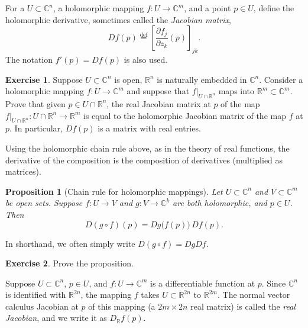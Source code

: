 \documentclass[12pt,openany]{book}
\newcommand{\C}{{\mathbb{C}}}
\newcommand{\R}{{\mathbb{R}}}
\newcommand{\myindex}[1]{#1\index{#1}}
\theoremstyle{plain}
\newtheorem{prop}[thm]{Proposition}
\theoremstyle{remark}
\theoremstyle{definition}
\newenvironment{exbox}{%
    \def\FrameCommand{\vrule width 1pt \relax\hspace{10pt}}%
    \MakeFramed {\advance \hsize -\width \FrameRestore}%
}{%
    \endMakeFramed
}
\theoremstyle{exercise}
\newtheorem{exercise}{Exercise}[section]
\theoremstyle{example}
\begin{document}
For a $U \subset \C^n$, a holomorphic mapping $f \colon U \to \C^m$,
and a point $p \in U$,
define the holomorphic derivative, sometimes called the
\emph{\myindex{Jacobian matrix}},
%
\begin{equation*}
Df(p)
\overset{\text{def}}{=}
\left[
\frac{\partial f_j}{\partial z_k} (p)
\right]_{jk} .
\end{equation*}
The notation $f'(p) = Df(p)$ is also used.

\begin{exbox}
\begin{exercise}
Suppose $U \subset \C^n$ is open, $\R^n$ is naturally embedded in $\C^n$.
Consider a holomorphic mapping $f \colon U \to \C^m$ and suppose that
$f|_{U \cap \R^n}$ maps into $\R^m \subset \C^m$.  Prove that given
$p \in U \cap \R^n$, the real
Jacobian matrix at $p$ of the map
$f|_{U \cap \R^n} \colon U \cap \R^n \to \R^m$ is equal to the holomorphic
Jacobian matrix of the map $f$ at $p$.  In particular, $Df(p)$ is a matrix
with real entries.
\end{exercise}
\end{exbox}

Using the holomorphic chain rule above, as in the theory of real functions,
the derivative of the composition is the composition of derivatives
(multiplied as matrices).

\begin{prop}[Chain rule for holomorphic mappings]
Let $U \subset \C^n$ and $V \subset \C^m$ be open sets.  Suppose
$f \colon U \to V$ and $g \colon V \to \C^k$ are both holomorphic,
and $p \in U$.  Then
\begin{equation*}
D(g \circ f)(p) = Dg\bigl(f(p)\bigr) \, Df(p) .
\end{equation*}
\end{prop}

In shorthand, we often simply write $D(g \circ f) = Dg Df$.

\begin{exbox}
\begin{exercise}
Prove the proposition.
\end{exercise}
\end{exbox}

Suppose $U \subset \C^n$, $p \in U$, and $f \colon U \to \C^m$
is a differentiable function at $p$.
Since $\C^n$ is identified with $\R^{2n}$, the mapping $f$
takes $U \subset \R^{2n}$ to $\R^{2m}$.  The normal vector calculus Jacobian at $p$
of this mapping (a $2m \times 2n$ real matrix) is called the
\emph{\myindex{real Jacobian}}, and we write it as
%
$D_\R f (p)$.
\end{document}
